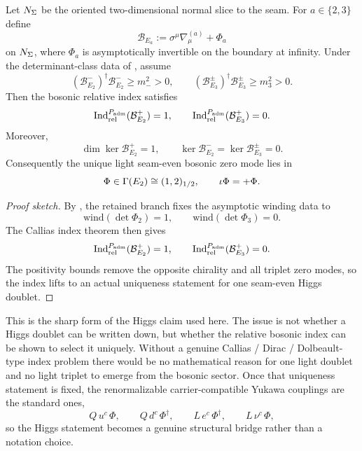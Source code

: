 \begin{theorem}
\label{thm:callias-higgs-selection}
Let $N_\Sigma$ be the oriented two-dimensional normal slice to the seam. For $a\in\{2,3\}$ define
\[
\mathcal B_{E_a}:=\sigma^\mu\nabla^{(a)}_\mu+\Phi_a
\]
on $N_\Sigma$, where $\Phi_a$ is asymptotically invertible on the boundary at infinity. Under the determinant-class data of , assume
\[
(\mathcal B_{E_2}^-)^\dagger\mathcal B_{E_2}^-\ge m_-^2>0,
\qquad
(\mathcal B_{E_3}^{\pm})^\dagger\mathcal B_{E_3}^{\pm}\ge m_3^2>0.
\]
Then the bosonic relative index satisfies
\[
\operatorname{Ind}_{\mathrm{rel}}^{P_{\mathrm{adm}}}(\mathcal B_{E_2}^+)=1,
\qquad
\operatorname{Ind}_{\mathrm{rel}}^{P_{\mathrm{adm}}}(\mathcal B_{E_3}^+)=0.
\]
Moreover,
\[
\dim\ker\mathcal B_{E_2}^+=1,
\qquad
\ker\mathcal B_{E_2}^-=\ker\mathcal B_{E_3}^{\pm}=0.
\]
Consequently the unique light seam-even bosonic zero mode lies in
\[
\Phi\in\Gamma(E_2)\cong (1,2)_{1/2},
\qquad
\iota\Phi=+\Phi.
\]
\end{theorem}

\begin{proof}[Proof sketch]
By , the retained branch fixes the asymptotic winding data to
\[
\mathrm{wind}(\det\Phi_2)=1,
\qquad
\mathrm{wind}(\det\Phi_3)=0.
\]
The Callias index theorem then gives
\[
\operatorname{Ind}_{\mathrm{rel}}^{P_{\mathrm{adm}}}(\mathcal B_{E_2}^+)=1,
\qquad
\operatorname{Ind}_{\mathrm{rel}}^{P_{\mathrm{adm}}}(\mathcal B_{E_3}^+)=0.
\]
The positivity bounds remove the opposite chirality and all triplet zero modes, so the index lifts to an actual uniqueness statement for one seam-even Higgs doublet.
\end{proof}

This is the sharp form of the Higgs claim used here. The issue is not whether a Higgs doublet can be written down, but whether the relative bosonic index can be shown to select it uniquely.
Without a genuine Callias / Dirac / Dolbeault-type index problem there would be no mathematical reason for one light doublet and no light triplet to emerge from the bosonic sector. Once that uniqueness statement is fixed, the renormalizable carrier-compatible Yukawa couplings are the standard ones,
\[
Q\,u^c\,\Phi,
\qquad
Q\,d^c\,\Phi^\dagger,
\qquad
L\,e^c\,\Phi^\dagger,
\qquad
L\,\nu^c\,\Phi,
\]
so the Higgs statement becomes a genuine structural bridge rather than a notation choice.

